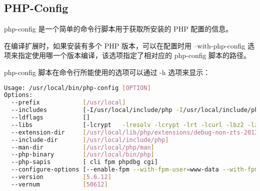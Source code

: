 \subsection{PHP-Config}

php-config 是一个简单的命令行脚本用于获取所安装的 PHP 配置的信息。

在编译扩展时，如果安装有多个 PHP 版本，可以在配置时用 --with-php-config 选项来指定使用哪一个版本编译，该选项指定了相对应的 php-config 脚本的路径。

php-config 脚本在命令行所能使用的选项可以通过 -h 选项来显示：


\begin{lstlisting}[language=bash]
Usage: /usr/local/bin/php-config [OPTION]
Options:
  --prefix            [/usr/local]
  --includes          [-I/usr/local/include/php -I/usr/local/include/php/main -I/usr/local/include/php/TSRM -I/usr/local/include/php/Zend -I/usr/local/include/php/ext -I/usr/local/include/php/ext/date/lib]
  --ldflags           []
  --libs              [-lcrypt   -lresolv -lcrypt -lrt -lcurl -lbz2 -lz -lrt -lm -ldl -lnsl  -lxml2 -lz -lm -ldl -lssl -lcrypto -lcurl -lxml2 -lz -lm -ldl -lxml2 -lz -lm -ldl -lcrypt -lxml2 -lz -lm -ldl -lxml2 -lz -lm -ldl -lxml2 -lz -lm -ldl -lssl -lcrypto -lcrypt ]
  --extension-dir     [/usr/local/lib/php/extensions/debug-non-zts-20131226]
  --include-dir       [/usr/local/include/php]
  --man-dir           [/usr/local/php/man]
  --php-binary        [/usr/local/bin/php]
  --php-sapis         [ cli fpm phpdbg cgi]
  --configure-options [--enable-fpm --with-fpm-user=www-data --with-fpm-group=www-data --enable-phpdbg --enable-phpdbg-debug --enable-debug --with-openssl --with-zlib --with-bz2 --with-curl --enable-mbstring --enable-pdo --with-pdo-mysql --with-pear]
  --version           [5.6.12]
  --vernum            [50612]
\end{lstlisting}


